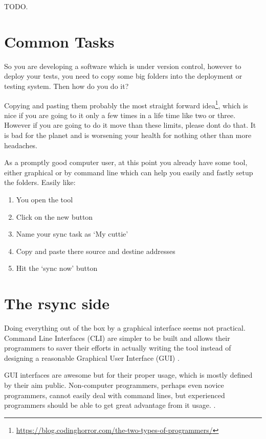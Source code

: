     TODO.



    \section{Common Tasks}

    So you are developing a software which is under version control, however to
    deploy your tests, you need to copy some big folders into the deployment or
    testing system. Then how do you do it?

    Copying and pasting them probably the most straight forward
    idea\footnote{\url{https://blog.codinghorror.com/the-two-types-of-programmers/}},
    which is
    nice if you are going to it only a few times in a life time like two or
    three. However if you are going to do it move than these limits,
    please don\q t do that. It is bad for the planet and is worsening your
    health for nothing other than more headaches.

    As a promptly good computer user, at this point you already have some tool,
    either graphical or by command line which can help you easily and fastly
    setup the folder\q s. Easily like:

    \begin{enumerate}
        \item You open the tool
        \item Click on the new button
        \item Name your sync task as `My cuttie'
        \item Copy and paste there source and destine addresses
        \item Hit the `sync now' button
    \end{enumerate}



    \section{The rsync side}

    Doing everything out of the box by a graphical interface seems not
    practical. Command Line Interfaces (CLI) are simpler to be built and allows
    their programmers to saver their efforts in actually writing the tool
    instead of designing a reasonable Graphical User Interface (GUI)
    \cite{quantificationOfInterface}.

    GUI interfaces are awesome but for their proper usage, which is mostly
    defined by their aim public. Non-computer programmers, perhaps even novice
    programmers, cannot easily deal with command lines, but experienced
    programmers should be able to get great advantage from it usage.
    \cite{commandLineInterface}.

